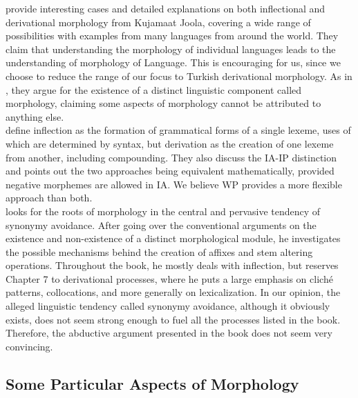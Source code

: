 \documentclass[11pt]{article} %
\begin{document}
\citet{Aronoff2005} provide interesting cases and detailed explanations on both inflectional and derivational morphology from Kujamaat Joola, covering a wide range of possibilities with examples from many languages from around the world. They claim that understanding the morphology of individual languages leads to the understanding of morphology of Language. This is encouraging for us, since we choose to reduce the range of our focus to Turkish derivational morphology. As in \citet{Aronoff1994}, they argue for the existence of a distinct linguistic component called morphology, claiming some aspects of morphology cannot be attributed to anything else. \\

\citet{Aronoff2005} define inflection as the formation of grammatical forms of a single lexeme, uses of which are determined by syntax, but derivation as the creation of one lexeme from another, including compounding. They also discuss the IA-IP distinction and points out the two approaches being equivalent mathematically, provided negative morphemes are allowed in IA. We believe WP provides a more flexible approach than both. \\ 

\citet{Carstairs-McCarthy2010} looks for the roots of morphology in the central and pervasive tendency of synonymy avoidance. After going over the conventional arguments on the existence and non-existence of a distinct morphological module, he investigates the possible mechanisms behind the creation of affixes and stem altering operations. Throughout the book, he mostly deals with inflection, but reserves Chapter 7 to derivational processes, where he puts a large emphasis on cliché patterns, collocations, and more generally on lexicalization. In our opinion, the alleged linguistic tendency called synonymy avoidance, although it obviously exists, does not seem strong enough to fuel all the processes listed in the book. Therefore, the abductive argument presented in the book does not seem very convincing. \\ 

\subsection{Some Particular Aspects of Morphology}


\end{document}
